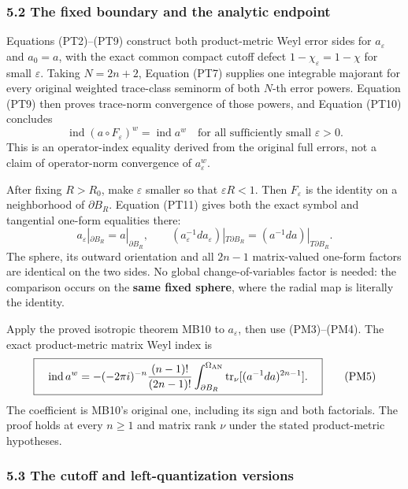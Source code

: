 \documentclass[
  11pt,
]{article}
\begin{document}
\subsubsection{5.2 The fixed boundary and the analytic
endpoint}\label{the-fixed-boundary-and-the-analytic-endpoint}

Equations (PT2)--(PT9) construct both product-metric Weyl error sides
for \(a_\varepsilon\) and \(a_0=a\), with the exact common compact
cutoff defect \(1-\chi_\varepsilon=1-\chi\) for small \(\varepsilon\).
Taking \(N=2n+2\), Equation (PT7) supplies one integrable majorant for
every original weighted trace-class seminorm of both \(N\)-th error
powers. Equation (PT9) then proves trace-norm convergence of those
powers, and Equation (PT10) concludes \[
 \operatorname{ind}(a\circ F_\varepsilon)^w
   =\operatorname{ind}a^w
   \quad\text{for all sufficiently small }\varepsilon>0 .
 \tag{PM3}
\] This is an operator-index equality derived from the original full
errors, not a claim of operator-norm convergence of \(a_\varepsilon^w\).

After fixing \(R>R_0\), make \(\varepsilon\) smaller so that
\(\varepsilon R<1\). Then \(F_\varepsilon\) is the identity on a
neighborhood of \(\partial B_R\). Equation (PT11) gives both the exact
symbol and tangential one-form equalities there: \[
 a_\varepsilon|_{\partial B_R}=a|_{\partial B_R},
 \qquad
 (a_\varepsilon^{-1}da_\varepsilon)|_{T\partial B_R}
  =(a^{-1}da)|_{T\partial B_R}.
 \tag{PM4}
\] The sphere, its outward orientation and all \(2n-1\) matrix-valued
one-form factors are identical on the two sides. No global
change-of-variables factor is needed: the comparison occurs on the
\textbf{same fixed sphere}, where the radial map is literally the
identity.

Apply the proved isotropic theorem MB10 to \(a_\varepsilon\), then use
(PM3)--(PM4). The exact product-metric matrix Weyl index is \[
 \boxed{\quad
 \operatorname{ind}a^w
 =-(-2\pi i)^{-n}\frac{(n-1)!}{(2n-1)!}
   \int_{\partial B_R}^{\Omega_{\rm AN}}
       \operatorname{tr}_{\nu}
          [(a^{-1}da)^{2n-1}] .
 \quad}
 \tag{PM5}
\] The coefficient is MB10's original one, including its sign and both
factorials. The proof holds at every \(n\ge1\) and matrix rank \(\nu\)
under the stated product-metric hypotheses.

\subsubsection{5.3 The cutoff and left-quantization
versions}\label{the-cutoff-and-left-quantization-versions}
\end{document}
